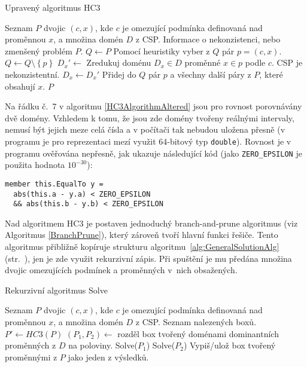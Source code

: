 \begin{algorithm}
\caption{Upravený algoritmus HC3}
\label{HC3AlgorithmAltered}
\begin{algorithmic}[1]
\Require Seznam $P$ dvojic $(c, x)$, kde $c$ je omezující podmínka definovaná nad proměnnou $x$, a množina domén $D$ z CSP.
\Ensure Informace o nekonzistenci, nebo zmenšený problém $P$.
\State $Q \gets P$
\State Pomocí heuristiky vyber z $Q$ pár $p = (c, x)$.
\State $Q \gets Q \setminus \left\{ p \right\}$
\State $D_x' \gets$ Zredukuj doménu $D_x \in D$ proměnné $x \in p$ podle $c$.
\State \Return CSP je nekonzistentní.
\EndIf
{}
\State $D_x \gets D_x'$
\State Přidej do $Q$ pár $p$ a všechny další páry z $P$, které obsahují $x$.
\EndIf
\EndWhile
\State \Return $P$
\EndProcedure
\end{algorithmic}
\end{algorithm}

Na řádku č.~7 v algoritmu \ref{HC3AlgorithmAltered} jsou pro rovnost porovnávány dvě domény. Vzhledem k tomu, že jsou zde domény tvořeny reálnými intervaly, nemusí být jejich meze celá čísla a v počítači tak nebudou uložena přesně (v programu je pro reprezentaci mezí využit 64-bitový typ \verb|double|). Rovnost je v programu ověřována nepřesně, jak ukazuje následující kód (jako \verb|ZERO_EPSILON| je použita hodnota $10^{-30}$):

\begin{Verbatim}[samepage=true]
member this.EqualTo y =
  abs(this.a - y.a) < ZERO_EPSILON 
  && abs(this.b - y.b) < ZERO_EPSILON
\end{Verbatim}

Nad algoritmem HC3 je postaven jednoduchý branch-and-prune algoritmus (viz Algoritmus \ref{BranchPrune}), který zároveň tvoří hlavní funkci řešiče. Tento algoritmus přibližně kopíruje strukturu algoritmu~\ref{alg:GeneralSolutionAlg} (str.~\pageref{alg:GeneralSolutionAlg}), jen je zde využit rekurzivní zápis. Při spuštění je mu předána množina dvojic omezujících podmínek a proměnných v~nich obsažených.

\begin{algorithm}
\caption{Rekurzivní algoritmus Solve}
\label{BranchPrune}
\begin{algorithmic}[1]
\Require Seznam $P$ dvojic $(c, x)$, kde $c$ je omezující podmínka definovaná nad proměnnou $x$, a množina domén $D$ z CSP.
\Ensure Seznam nalezených boxů.
\State $P' \gets HC3(P)$
\State $(P_1, P_2) \gets $ rozděl box tvořený doménami dominantních proměnných z $D$ na poloviny.
\State Solve($P_1$)
\State Solve($P_2$)
\Else
\State Vypiš/ulož box tvořený proměnnými z $P$ jako jeden z výsledků.
\EndIf
\EndProcedure
\end{algorithmic}
\end{algorithm}

